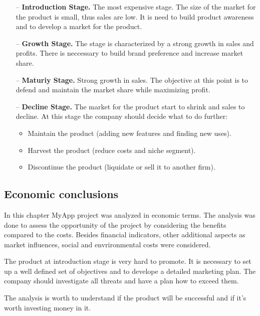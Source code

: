 \begin{itemize}

\item[--] \textbf{Introduction Stage.} The most expensive stage. The size of the market for the product is small, thus sales are low. It is need to build product awareness and to develop a market for the product.

\item[--] \textbf{Growth Stage.} The stage is characterized by a strong growth in sales and profits. There is neccessary to build brand preference and increase market share.

\item[--] \textbf{Maturiy Stage.} Strong growth in sales. The objective at this point is to defend and maintain the market share while maximizing profit. 

\item[--] \textbf{Decline Stage.} The market for the product start to shrink and sales to decline. At this stage the company should decide what to do further: 

\begin{itemize}

\item Maintain the product (adding new features and finding new uses).

\item Harvest the product (reduce costs and niche segment).

\item Discontinue the product (liquidate or sell it to another firm).\cite{stages}

\end{itemize}
\end{itemize}

\subsection{Economic conclusions}

In this chapter MyApp project was analyzed in economic terms. The analysis was done to assess the opportunity of the project by considering the benefits compared to the costs. Besides financial indicators, other additional aspects as market influences, social and envrironmental costs were considered. 

The product at introduction stage is very hard to promote. It is necessary to set up a well defined set of objectives and to develope a detailed marketing plan. The company should investigate all threats and have a plan how to exceed them. 

The analysis is worth to understand if the product will be successful and if it's worth investing money in it.








